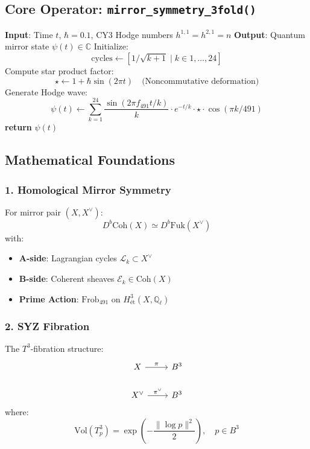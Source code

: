 \documentclass[12pt]{article}
\begin{document}
\subsection*{Core Operator: \texttt{mirror\_symmetry\_3fold()}}
\begin{algorithm}[H]
\caption{Mirror Symmetry Cognitive Embedding}
\begin{algorithmic}[1]
\State \textbf{Input}: Time $t$, $\hbar=0.1$, CY3 Hodge numbers $h^{1,1}=h^{2,1}=n$
\State \textbf{Output}: Quantum mirror state $\psi(t) \in \mathbb{C}$
\State Initialize:
\[
\text{cycles} \gets [1/\sqrt{k+1} \mid k \in 1,\dots,24]
\]
\State Compute star product factor:
\[
\star \gets 1 + \hbar \sin(2\pi t) \quad \text{(Noncommutative deformation)}
\]
\State Generate Hodge wave:
\[
\psi(t) \gets \sum_{k=1}^{24} \frac{\sin(2\pi f_{491} t/k)}{k} \cdot e^{-t/k} \cdot \star \cdot \cos(\pi k/491)
\]
\State \textbf{return} $\psi(t)$ 
\end{algorithmic}
\end{algorithm}

\subsection*{Mathematical Foundations}
\subsubsection*{1. Homological Mirror Symmetry}
For mirror pair $(X, X^\vee)$:
\[
D^b\text{Coh}(X) \simeq D^b\text{Fuk}(X^\vee)
\]
with:
\begin{itemize}
    \item \textbf{A-side}: Lagrangian cycles $\mathcal{L}_k \subset X^\vee$
    \item \textbf{B-side}: Coherent sheaves $\mathcal{E}_k \in \text{Coh}(X)$
    \item \textbf{Prime Action}: $\text{Frob}_{491}$ on $H^3_{\text{ét}}(X, \mathbb{Q}_\ell)$
\end{itemize}

\subsubsection*{2. SYZ Fibration}
The $T^3$-fibration structure:
\[
\begin{tikzcd}
X \arrow[r, "\pi"] & B^3 \\
X^\vee \arrow[r, "\pi^\vee"] & B^3
\end{tikzcd}
\]
where:
\[
\text{Vol}(T^3_{p}) = \exp\left(-\frac{\|\log p\|^2}{2}\right), \quad p \in B^3
\]
\end{document}
